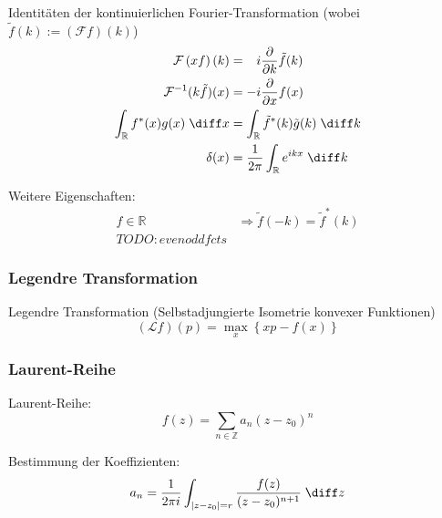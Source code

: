 \documentclass[11pt]{article}
\numberwithin{equation}{section}
\begin{document}
        Identitäten der kontinuierlichen Fourier-Transformation (wobei $\tilde{f}(k) := \left(\mathcal{F}f\right)(k)$)
        \begin{equation}
          \begin{aligned}
            \mathcal{F}\left(xf\right)(k) &= \phantom{-}i \pder{}{k}\tilde{f}(k) \\
            \mathcal{F}^{-1}(k\tilde{f})(x) &= -i\pder{}{x}f(x) \\
            \int_{\mathbb{R}} f^{*}(x) g(x)\;\diff x &=
            \int_{\mathbb{R}}\tilde{f}^{*}(k)\tilde{g}(k)\;\diff k \\
            \delta(x) &= \frac{1}{2\pi}\int_{\mathbb{R}}e^{ikx}\;\diff k \\
            \label{eq:fourierIdentities}
          \end{aligned}
        \end{equation}

        Weitere Eigenschaften:
        \begin{equation}
          \begin{aligned}
            f\in\mathbb{R}
            &\Rightarrow \tilde{f}(-k)=\tilde{f}^*(k) \\
            TODO: even odd fcts
          \end{aligned}
        \end{equation}

      \subsubsection{Legendre Transformation}
        Legendre Transformation (Selbstadjungierte Isometrie konvexer Funktionen)
        \begin{equation}
          (\mathcal{L}f)(p)=\max_x\left\lbrace xp-f(x) \right\rbrace
        \end{equation}


      \subsubsection{Laurent-Reihe}
        Laurent-Reihe:
        \begin{equation}
          f(z)=\sum_{n\in\mathbb{Z}} a_n(z-z_0)^n
        \end{equation}

        Bestimmung der Koeffizienten:
        \begin{equation}
          a_n = \frac{1}{2 \pi i}\int_{\left| z-z_0 \right| = r} \frac{f(z)}{(z-z_0)^{n+1}}\;\diff z
        \end{equation}
\end{document}

